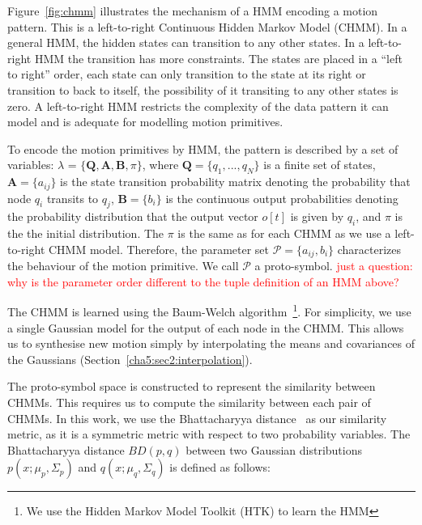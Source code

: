 Figure~\ref{fig:chmm} illustrates the mechanism of a HMM encoding a motion pattern. This is a left-to-right Continuous Hidden Markov Model (CHMM). In a general HMM, the hidden states can transition to any other states. In a left-to-right HMM the transition has more constraints. The states are placed in a ``left to right'' order, each state can only transition to the state at its right or transition to back to itself, the possibility of it transiting to any other states is zero. A left-to-right HMM restricts the complexity of the data pattern it can model and is adequate for modelling motion primitives.

To encode the motion primitives by HMM, the pattern is described by a set of variables: $\lambda$ = $\{\boldsymbol{Q},\boldsymbol{A},\boldsymbol{B},\pi\}$, where $\boldsymbol{Q}=\{q_1, ..., q_N\}$ is a finite set of states, $\boldsymbol{A}=\{a_{ij}\}$ is the state transition probability matrix denoting the probability that node $q_i$ transits to $q_j$, $\boldsymbol{B}=\{b_{i}\}$ is the continuous output probabilities denoting the probability distribution that the output vector $o[t]$ is given by $q_i$, and $\pi$ is the the initial distribution. The $\pi$ is the same as for each CHMM as we use a left-to-right CHMM model. Therefore, the parameter set $\mathcal{P} = \{a_{ij},b_i\}$ characterizes the behaviour of the motion primitive. We call $\mathcal{P}$ a proto-symbol.
\textcolor{red}{just a question: why is the parameter order different to the tuple definition of an HMM above?}

The CHMM is learned using the Baum-Welch algorithm~\citep{rabiner1989tutorial}\footnote{We use the Hidden Markov Model Toolkit (HTK) to learn the HMM}.
For simplicity, we use a single Gaussian model for the output of each node in the CHMM. This allows us to synthesise new motion simply by interpolating the means and covariances of the Gaussians (Section~\ref{cha5:sec2:interpolation}).

The proto-symbol space is constructed to represent the similarity between CHMMs. This requires us to compute the similarity between each pair of CHMMs. In this work, we use the Bhattacharyya distance~\citep{kailath1967divergence} as our similarity metric, as it is a symmetric metric with respect to two probability variables. The Bhattacharyya distance $BD(p,q)$ between two Gaussian distributions $p(x;\mu_p,\Sigma_p)$ and $q(x;\mu_q,\Sigma_q)$ is defined as follows:



